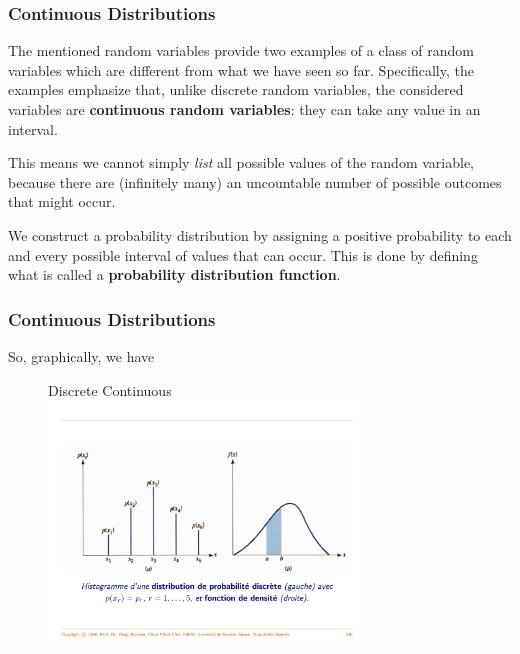 \documentclass[notes=show,smaller,handout]{beamer}
\begin{document}
\begin{frame}%
\frametitle{Continuous Distributions}

The mentioned random variables provide two examples of a class of random variables which are different from what we have seen so far. 
Specifically, the examples emphasize that,
unlike discrete random variables, the considered variables are \textbf{continuous random variables}:
they can take any value in an interval. \\ \vspace{0.6cm}

This means we cannot simply \emph{list} all possible values of the
random variable, because there are (infinitely many) an uncountable number of possible outcomes that might occur. \\ \vspace{0.6cm}


 We construct a probability distribution by assigning a positive probability to each and every possible interval of values that can occur. This is done by defining what is called a \textbf{probability distribution function}. 

\end{frame}%


\begin{frame}%
\frametitle{Continuous Distributions}
So, graphically, we have \\ \vspace{0.5cm}
\begin{figure}
\hspace{1cm} Discrete \hspace{3cm} Continuous\\
\includegraphics[width=0.75\textwidth,height=0.5\textheight]{discr_vs_cont.pdf}
\end{figure}

\end{frame}%
\end{document}
